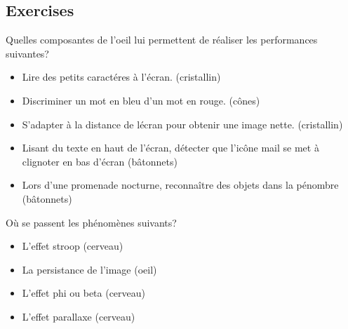 \subsection{Exercises}

\begin{exercise}
Quelles composantes de l'oeil lui permettent de r\'ealiser les performances suivantes?
\end{exercise}
\begin{itemize}
\item Lire des petits caract\'eres \`a l'\'ecran. (cristallin)
\item Discriminer un mot en bleu d'un mot en rouge. (c\^ones)
\item S'adapter \`a la distance de l\'ecran pour obtenir une image nette. (cristallin)
\item Lisant du texte en haut de l'\'ecran, d\'etecter que l'ic\^one mail se met \`a clignoter en bas d'\'ecran (b\^atonnets)
\item Lors d'une promenade nocturne, reconna\^itre des objets dans la p\'enombre (b\^atonnets)
\end{itemize}

\begin{exercise}
O\`u se passent les ph\'enom\`enes suivants? 
\end{exercise}
\begin{itemize}
\item L'effet stroop (cerveau)
\item La persistance de l'image (oeil)
\item L'effet phi ou beta (cerveau)
\item L'effet parallaxe (cerveau)
\end{itemize}












